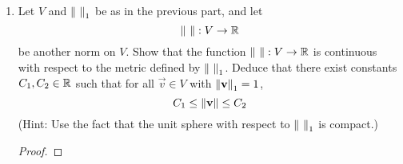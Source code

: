 \documentclass[../psets.tex]{subfiles}
\begin{document}
\begin{enumerate}
\begin{enumerate}
\begin{proof}
\begin{align*}
                &= \norm{a_1\vec{e}_1+\cdots+a_n\vec{e}_n}_1+\norm{b_1\vec{e}_1+\cdots+b_n\vec{e}_n}_1
            \end{align*}
            as desired.\par
            For the third one, suppose first that $\norm{a_1\vec{e}_1+\cdots+a_n\vec{e}_n}_1=0$. Then $|a_1|+\cdots+|a_n|=0$, so we must have $a_i=0$ for all $i$ by the properties of the absolute value. This implies that
            \begin{equation*}
                a_1\vec{e}_1+\cdots+a_n\vec{e}_n = 0\vec{e}_1+\cdots+0\vec{e}_n
                = \bm{0}
            \end{equation*}
            as desired. On the other hand, suppose that $a_1\vec{e}_1+\cdots+a_n\vec{e}_n=\bm{0}$. Then since $\vec{e}_1,\dots,\vec{e}_n$ is a basis (hence linearly independent), we must have that $a_1=\cdots=a_n=0$. This implies that
            \begin{equation*}
                \norm{a_1\vec{e}_1+\cdots+a_n\vec{e}_n}_1 = \norm{0\vec{e}_1+\cdots+0\vec{e}_n}
                = \sum_{i=1}^n|0|
                = 0
            \end{equation*}
            as desired.
        \end{proof}
        \item Let $V$ and $\norm{\ }_1$ be as in the previous part, and let
        \begin{equation*}
            \norm{\ }:V\to\mathbb{R}
        \end{equation*}
        be another norm on $V$. Show that the function $\norm{\ }:V\to\R$ is continuous with respect to the metric defined by $\norm{\ }_1$. Deduce that there exist constants $C_1,C_2\in\mathbb{R}$ such that for all $\vec{v}\in V$ with $\norm{\mathbf{v}}_1=1$,
        \begin{equation*}
            C_1 \leq \norm{\mathbf{v}} \leq C_2
        \end{equation*}
        (Hint: Use the fact that the unit sphere with respect to $\norm{\ }_1$ is compact.)
        \begin{proof}



\end{proof}
\end{enumerate}
\end{enumerate}
\end{document}
